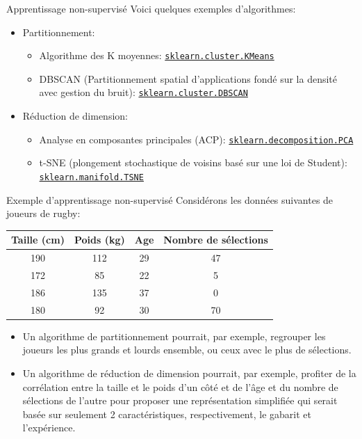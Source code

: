 \documentclass[10pt]{beamer}  %
\begin{document}
\begin{frame}{Apprentissage non-supervisé}
	Voici quelques exemples d'algorithmes:
	
	\begin{itemize}
		\item Partitionnement:
			\begin{itemize}
				\item Algorithme des K moyennes: \href{https://scikit-learn.org/stable/modules/generated/sklearn.cluster.KMeans.html}{\texttt{sklearn.cluster.KMeans}}
				\item DBSCAN (Partitionnement spatial d'applications fondé sur la densité avec gestion du bruit): \href{https://scikit-learn.org/stable/modules/generated/sklearn.cluster.DBSCAN.html}{\texttt{sklearn.cluster.DBSCAN}}
			\end{itemize}
		\item Réduction de dimension:
			\begin{itemize}
				\item Analyse en composantes principales (ACP): \href{https://scikit-learn.org/stable/modules/generated/sklearn.decomposition.PCA.html}{\texttt{sklearn.decomposition.PCA}}
				\item t-SNE (plongement stochastique de voisins basé sur une loi de Student): \href{https://scikit-learn.org/stable/modules/generated/sklearn.manifold.TSNE.html}{\texttt{sklearn.manifold.TSNE}}
			\end{itemize}
   \end{itemize}
\end{frame}

\begin{frame}{Exemple d'apprentissage non-supervisé}
	Considérons les données suivantes de joueurs de rugby:
	\begin{table}
		\centering
		\begin{tabular}{|c|c|c|c|}
			\hline
			\textbf{Taille} (cm) & \textbf{Poids} (kg) & \textbf{Age} & \textbf{Nombre de sélections} \\ \hline
			190             & 112            & 29           & 47 \\
			172             & 85             & 22           & 5  \\
			186             & 135            & 37           & 0  \\
			180             & 92             & 30           & 70 \\
			\hline
		\end{tabular}
	\end{table}
	\begin{itemize}
		\item Un algorithme de partitionnement pourrait, par exemple, regrouper les joueurs les plus grands et lourds ensemble, ou ceux avec le plus de sélections.
		\item Un algorithme de réduction de dimension pourrait, par exemple, profiter de la corrélation entre la taille et le poids d'un côté et de l'âge et du nombre de sélections de l'autre pour proposer une représentation simplifiée qui serait basée sur seulement 2 caractéristiques, respectivement, le gabarit et l'expérience.
	\end{itemize}
\end{frame}
\end{document}
